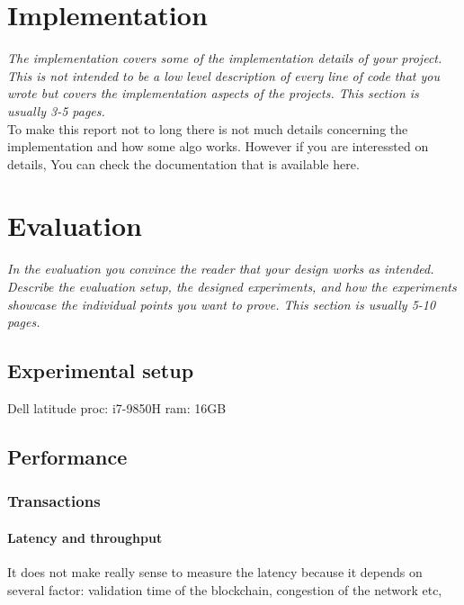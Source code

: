 \documentclass[a4paper,11pt,oneside]{report}
\begin{document}
\chapter{Implementation}

\textit{The implementation covers some of the implementation details of your project.
This is not intended to be a low level description of every line of code that
you wrote but covers the implementation aspects of the projects.
This section is usually 3-5 pages.} \\

To make this report not to long there is not much details concerning the implementation and how some algo works. However if you are interessted on details, You can check the documentation that is available here.


\chapter{Evaluation}

\textit{In the evaluation you convince the reader that your design works as intended.
Describe the evaluation setup, the designed experiments, and how the
experiments showcase the individual points you want to prove.
This section is usually 5-10 pages.} \\

\section{Experimental setup}
Dell latitude 
proc: i7-9850H
ram: 16GB


\section{Performance}

\subsection{Transactions}

\subsubsection{Latency and throughput}
It does not make really sense to measure the latency because it depends on several factor: validation time of the blockchain, congestion of the network etc,
\end{document}
